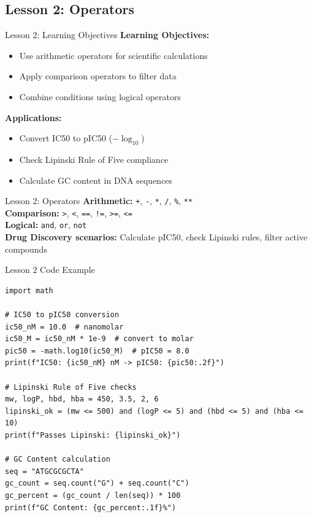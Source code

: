 \documentclass{beamer}
\begin{document}
\subsection{Lesson 2: Operators}

\begin{frame}{Lesson 2: Learning Objectives}
    \small
    \textbf{Learning Objectives:}
    \begin{itemize}
        \item Use arithmetic operators for scientific calculations
        \item Apply comparison operators to filter data
        \item Combine conditions using logical operators
    \end{itemize}
    \vspace{0.5em}
    \textbf{Applications:}
    \begin{itemize}
        \item Convert IC50 to pIC50 ($-\log_{10}$)
        \item Check Lipinski Rule of Five compliance
        \item Calculate GC content in DNA sequences
    \end{itemize}
\end{frame}

\begin{frame}{Lesson 2: Operators}
    \small
    \textbf{Arithmetic:} \texttt{+}, \texttt{-}, \texttt{*}, \texttt{/}, \texttt{\%}, \texttt{**}\\[0.5em]
    \textbf{Comparison:} \texttt{>}, \texttt{<}, \texttt{==}, \texttt{!=}, \texttt{>=}, \texttt{<=}\\[0.5em]
    \textbf{Logical:} \texttt{and}, \texttt{or}, \texttt{not}\\[0.5em]
    \textbf{Drug Discovery scenarios:} Calculate pIC50, check Lipinski rules, filter active compounds
\end{frame}

\begin{frame}[fragile]{Lesson 2 Code Example}
    \small
    \begin{lstlisting}[style=codeStyle]
import math

# IC50 to pIC50 conversion
ic50_nM = 10.0  # nanomolar
ic50_M = ic50_nM * 1e-9  # convert to molar
pic50 = -math.log10(ic50_M)  # pIC50 = 8.0
print(f"IC50: {ic50_nM} nM -> pIC50: {pic50:.2f}")

# Lipinski Rule of Five checks
mw, logP, hbd, hba = 450, 3.5, 2, 6
lipinski_ok = (mw <= 500) and (logP <= 5) and (hbd <= 5) and (hba <= 10)
print(f"Passes Lipinski: {lipinski_ok}")

# GC Content calculation
seq = "ATGCGCGCTA"
gc_count = seq.count("G") + seq.count("C")
gc_percent = (gc_count / len(seq)) * 100
print(f"GC Content: {gc_percent:.1f}%")
    \end{lstlisting}
\end{frame}
\end{document}
